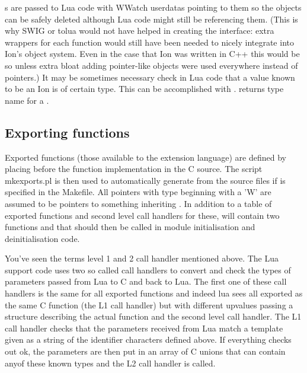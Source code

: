 s are passed to Lua code with WWatch userdatas pointing to
them so the objects can be safely deleted although Lua code might still be
referencing them. (This is why SWIG or tolua would not have helped in
creating the interface: extra wrappers for each function would still
have been needed to nicely integrate into Ion's object system. Even in
the case that Ion was written in C++ this would be so unless extra bloat
adding pointer-like objects were used everywhere instead of pointers.)
It may be sometimes necessary check in Lua code that a value known to
be an Ion  is of certain type. This can be accomplished with
.  returns type
name for a .


\subsection{Exporting functions}
\label{sec:exporting}

Exported functions (those available to the extension language) are
defined by placing  before the function implementation
in the C source. The script mkexports.pl is then used to automatically
generate  from the source files if
is specified in the Makefile. All pointers with type beginning with a 'W'
are assumed to be pointers to something inheriting . In
addition to a table of exported functions and second level call handlers
for these,  will contain two functions
 and
 that should then be called in module
initialisation and deinitialisation code.

You've seen the terms level 1 and 2 call handler mentioned above. 
The Lua support code uses two so called call handlers to convert and check
the types of parameters passed from Lua to C and back to Lua. The first
one of these call handlers is the same for all exported functions and
indeed lua sees all exported as the same C function (the L1 call handler)
but with different upvalues passing a structure describing the actual
function and the second level call handler. The L1 call handler checks
that the parameters received from Lua match a template given as a string
of the identifier characters defined above. If everything checks out ok,
the parameters are then put in an array of C unions that can contain
anyof these known types and the L2 call handler is called.

